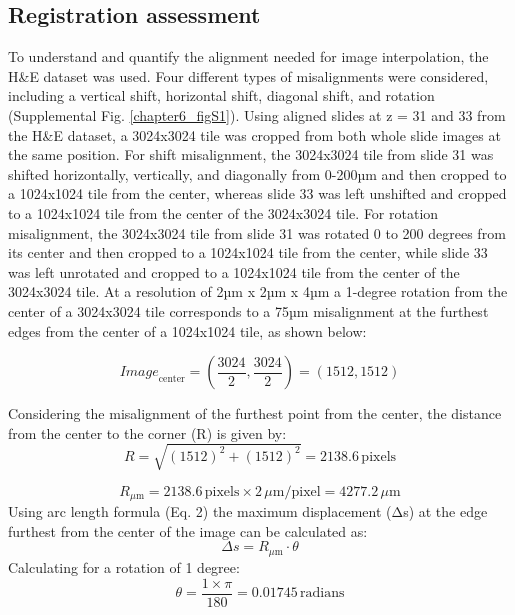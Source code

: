 \begin{refsection}
    \subsection{Registration assessment}
    To understand and quantify the alignment needed for image interpolation, the H&E dataset was used. Four different types of misalignments were considered, including a vertical shift, horizontal shift, diagonal shift, and rotation (Supplemental Fig. \ref{chapter6_figS1}). Using aligned slides at z = 31 and 33 from the H\&E dataset, a 3024x3024 tile was cropped from both whole slide images at the same position. For shift misalignment, the 3024x3024 tile from slide 31 was shifted horizontally, vertically, and diagonally from 0-200µm and then cropped to a 1024x1024 tile from the center, whereas slide 33 was left unshifted and cropped to a 1024x1024 tile from the center of the 3024x3024 tile. For rotation misalignment, the 3024x3024 tile from slide 31 was rotated 0 to 200 degrees from its center and then cropped to a 1024x1024 tile from the center, while slide 33 was left unrotated and cropped to a 1024x1024 tile from the center of the 3024x3024 tile. At a resolution of 2µm x 2µm x 4µm a 1-degree rotation from the center of a 3024x3024 tile corresponds to a 75µm misalignment at the furthest edges from the center of a 1024x1024 tile, as shown below: 
    
    \begin{equation}
    \label{chapter6_img_center}
        \textit{Image}_{\text{center}} = \left( \frac{3024}{2}, \frac{3024}{2} \right) = (1512, 1512)
    \end{equation}
    
    Considering the misalignment of the furthest point from the center, the distance from the center to the corner (R) is given by:
    \begin{equation}
        R = \sqrt{(1512)^2 + (1512)^2} = 2138.6 \, \text{pixels}
    \end{equation}
    
    \begin{equation}
        R_{\mu\text{m}} = 2138.6 \, \text{pixels} \times 2 \, \mu\text{m/pixel} = 4277.2 \, \mu\text{m}
    \end{equation}
    Using arc length formula (Eq. 2) the maximum displacement (Δs) at the edge furthest from the center of the image can be calculated as:
   \begin{equation}
   \label{chapter_6_eq2}
        \Delta s = R_{\mu\text{m}} \cdot \theta \tag{Eq.~2}
    \end{equation}
    Calculating for a rotation of 1 degree:
    \begin{equation}
        \theta = \frac{1 \times \pi}{180} = 0.01745 \, \text{radians}
    \end{equation}
    

\end{refsection}
